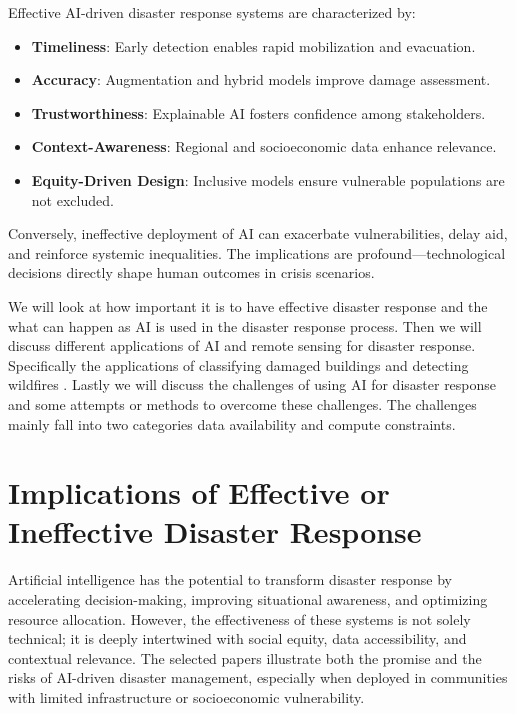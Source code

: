 \documentclass[conference,a4paper]{IEEEtran}
\begin{document}
Effective AI-driven disaster response systems are characterized by:

\begin{itemize}
    \item \textbf{Timeliness}: Early detection enables rapid mobilization and evacuation.
    \item \textbf{Accuracy}: Augmentation and hybrid models improve damage assessment.
    \item \textbf{Trustworthiness}: Explainable AI fosters confidence among stakeholders.
    \item \textbf{Context-Awareness}: Regional and socioeconomic data enhance relevance.
    \item \textbf{Equity-Driven Design}: Inclusive models ensure vulnerable populations are not excluded.
\end{itemize}

Conversely, ineffective deployment of AI can exacerbate vulnerabilities, delay aid, and reinforce systemic inequalities. The implications are profound—technological decisions directly shape human outcomes in crisis scenarios.

We will look at how important it is to have effective disaster response and the what can happen as AI is used in the disaster response process. Then we will discuss different applications of AI and remote sensing for disaster response. Specifically the applications of classifying damaged buildings \cite{kimDisasterAssessmentUsing2022,teohExploringGenerativeAI2024,lagapEnhancingPostDisasterDamage2025} and detecting wildfires \cite{elbohy2025fusion,jiaoForestFirePatterns2023}. Lastly we will discuss the challenges of using AI for disaster response and some attempts or methods to overcome these challenges. The challenges mainly fall into two categories data availability and compute constraints.



\section{Implications of Effective or Ineffective Disaster Response}

Artificial intelligence has the potential to transform disaster response by accelerating decision-making, improving situational awareness, and optimizing resource allocation. However, the effectiveness of these systems is not solely technical; it is deeply intertwined with social equity, data accessibility, and contextual relevance. The selected papers illustrate both the promise and the risks of AI-driven disaster management, especially when deployed in communities with limited infrastructure or socioeconomic vulnerability.
\end{document}
